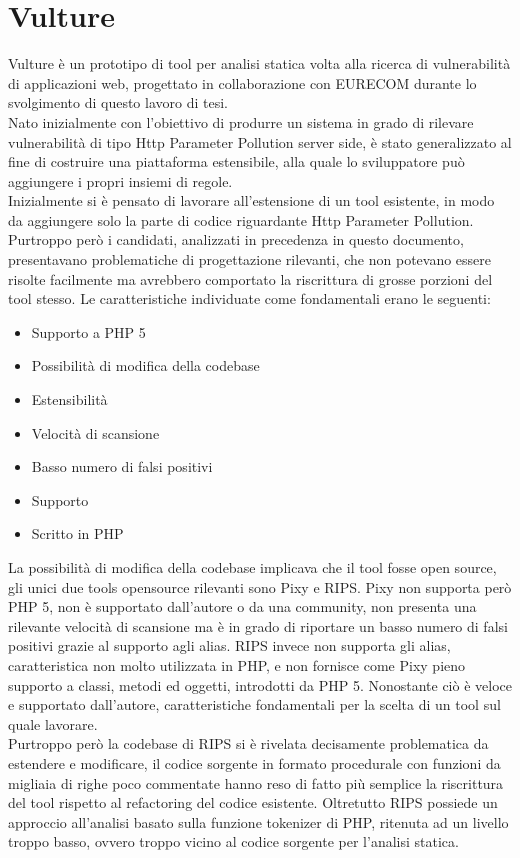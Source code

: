 \chapter{Vulture}
Vulture\cite{vulture} è un prototipo di tool per analisi statica volta alla ricerca di vulnerabilità di applicazioni web, progettato in collaborazione con EURECOM durante lo svolgimento di questo lavoro di tesi.\\
Nato inizialmente con l'obiettivo di produrre un sistema in grado di rilevare vulnerabilità di tipo Http Parameter Pollution server side, è stato generalizzato al fine di costruire una piattaforma estensibile, alla quale lo sviluppatore può aggiungere i propri insiemi di regole.\\
Inizialmente si è pensato di lavorare all'estensione di un tool esistente, in modo da aggiungere solo la parte di codice riguardante Http Parameter Pollution. Purtroppo però i candidati, analizzati in precedenza in questo documento, presentavano problematiche di progettazione rilevanti, che non potevano essere risolte facilmente ma avrebbero comportato la riscrittura di grosse porzioni del tool stesso. 
Le caratteristiche individuate come fondamentali erano le seguenti:
\begin{itemize}
\item Supporto a PHP 5
\item Possibilità di modifica della codebase
\item Estensibilità
\item Velocità di scansione
\item Basso numero di falsi positivi
\item Supporto
\item Scritto in PHP
\end{itemize}
La possibilità di modifica della codebase implicava che il tool fosse open source, gli unici due tools opensource rilevanti sono Pixy e RIPS.
Pixy non supporta però PHP 5, non è supportato dall'autore o da una community, non presenta una rilevante velocità di scansione ma è in grado di riportare un basso numero di falsi positivi grazie al supporto agli alias.
RIPS invece non supporta gli alias, caratteristica non molto utilizzata in PHP, e non fornisce come Pixy pieno supporto a classi, metodi ed oggetti, introdotti da PHP 5. Nonostante ciò è veloce e supportato dall'autore, caratteristiche fondamentali per la scelta di un tool sul quale lavorare.\\
Purtroppo però la codebase di RIPS si è rivelata decisamente problematica da estendere e modificare, il codice sorgente in formato procedurale con funzioni da migliaia di righe poco commentate hanno reso di fatto più semplice la riscrittura del tool rispetto al refactoring del codice esistente. Oltretutto RIPS possiede un approccio all'analisi basato sulla funzione tokenizer di PHP, ritenuta ad un livello troppo basso, ovvero troppo vicino al codice sorgente per l'analisi statica.

